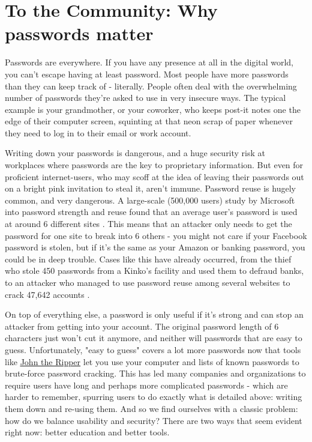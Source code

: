 \documentclass[jou]{apa6}
\begin{document}
\section{To the Community: Why passwords matter}
Passwords are everywhere. If you have any presence at all in the digital world, you can't escape having at least password. Most people have more passwords than they can keep track of - literally. People often deal with the overwhelming number of passwords they're asked to use in very insecure ways. The typical example is your grandmother, or your coworker, who keeps post-it notes one the edge of their computer screen, squinting at that neon scrap of paper whenever they need to log in to their email or work account. 

Writing down your passwords is dangerous, and a huge security risk at workplaces where passwords are the key to proprietary information. But even for proficient internet-users, who may scoff at the idea of leaving their passwords out on a bright pink invitation to steal it, aren't immune. Password reuse is hugely common, and very dangerous. A large-scale (500,000 users) study by Microsoft into password strength and reuse found that an average user's password is used at around 6 different sites \parencite{floren07}. This means that an attacker only needs to get the password for one site to break into 6 others - you might not care if your Facebook password is stolen, but if it's the same as your Amazon or banking password, you could be in deep trouble. Cases like this have already occurred, from the thief who stole 450 passwords from a Kinko's facility and used them to defraud banks, to an attacker who managed to use password reuse among several websites to crack 47,642 accounts \parencite{ives04}.

On top of everything else, a password is only useful if it's strong and can stop an attacker from getting into your account. The original password length of 6 characters just won't cut it anymore, and neither will passwords that are easy to guess. Unfortunately, "easy to guess" covers a lot more passwords now that tools like \href{http://www.openwall.com/john/}{\color{blue}\underline{John the Ripper}} let you use your computer and lists of known passwords to brute-force password cracking. This has led many companies and organizations to require users have long and perhaps more complicated passwords - which are harder to remember, spurring users to do exactly what is detailed above: writing them down and re-using them. And so we find ourselves with a classic problem: how do we balance usability and security? There are two ways that seem evident right now: better education and better tools.
\end{document}
